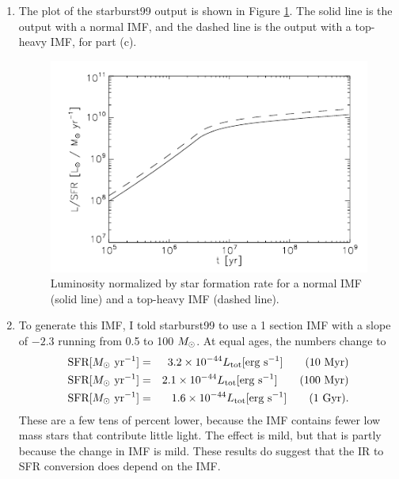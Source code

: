\begin{enumerate}
\begin{enumerate}
\item
The plot of the starburst99 output is shown in Figure \ref{fig:hw1sol1}. The solid line is the output with a normal IMF, and the dashed line is the output with a top-heavy IMF, for part (c).

\begin{figure}
\includegraphics[width=\linewidth]{graphics/hw1sol1}
\caption[Solution to problem set~\thesolutionset, problem~\theenumi\theenumii]{
\label{fig:hw1sol1}
Luminosity normalized by star formation rate for a normal IMF (solid line) and a top-heavy IMF (dashed line).
}
\end{figure}

\item To generate this IMF, I told starburst99 to use a 1 section IMF with a slope of $-2.3$ running from 0.5 to 100 $M_{\odot}$. At equal ages, the numbers change to
\begin{eqnarray*}
\mbox{SFR}[M_{\odot}\mbox{ yr}^{-1}] & = & 3.2\times 10^{-44} L_{\rm tot}[\mbox{erg s}^{-1}]\qquad\mbox{(10 Myr)} \\
\mbox{SFR}[M_{\odot}\mbox{ yr}^{-1}] & = & 2.1\times 10^{-44} L_{\rm tot}[\mbox{erg s}^{-1}]\qquad\mbox{(100 Myr)} \\
\mbox{SFR}[M_{\odot}\mbox{ yr}^{-1}] & = & 1.6\times 10^{-44} L_{\rm tot}[\mbox{erg s}^{-1}]\qquad\mbox{(1 Gyr)}.
\end{eqnarray*}
These are a few tens of percent lower, because the IMF contains fewer low mass stars that contribute little light. The effect is mild, but that is partly because the change in IMF is mild. These results do suggest that the IR to SFR conversion does depend on the IMF.

\end{enumerate}

\end{enumerate}
